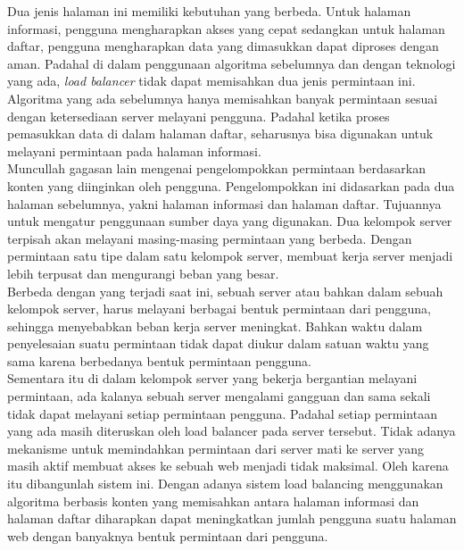 \documentclass{ta-its}
\begin{document}
			\indent Dua jenis halaman ini memiliki kebutuhan yang berbeda. Untuk halaman informasi, pengguna mengharapkan akses yang cepat sedangkan untuk halaman daftar, pengguna mengharapkan data yang dimasukkan dapat diproses dengan aman. Padahal di dalam penggunaan algoritma sebelumnya dan dengan teknologi yang ada, \emph{load balancer} tidak dapat memisahkan dua jenis permintaan ini. Algoritma yang ada sebelumnya hanya memisahkan banyak permintaan sesuai dengan ketersediaan server melayani pengguna. Padahal ketika proses pemasukkan data di dalam halaman daftar, seharusnya bisa digunakan untuk melayani permintaan pada halaman informasi. \\
			\indent Muncullah gagasan lain mengenai pengelompokkan permintaan berdasarkan konten yang diinginkan oleh pengguna. Pengelompokkan ini didasarkan pada dua halaman sebelumnya, yakni halaman informasi dan halaman daftar. Tujuannya untuk mengatur penggunaan sumber daya yang digunakan. Dua kelompok server terpisah akan melayani masing-masing permintaan yang berbeda. Dengan permintaan satu tipe dalam satu kelompok server, membuat kerja server menjadi lebih terpusat dan mengurangi beban yang besar. \\
			\indent Berbeda dengan yang terjadi saat ini, sebuah server atau bahkan dalam sebuah kelompok server, harus melayani berbagai bentuk permintaan dari pengguna, sehingga menyebabkan beban kerja server meningkat. Bahkan waktu dalam penyelesaian suatu permintaan tidak dapat diukur dalam satuan waktu yang sama karena berbedanya bentuk permintaan pengguna. \\
			\indent Sementara itu di dalam kelompok server yang bekerja bergantian melayani permintaan, ada kalanya sebuah server mengalami gangguan dan sama sekali tidak dapat melayani setiap permintaan pengguna. Padahal setiap permintaan yang ada masih diteruskan oleh load balancer pada server tersebut. Tidak adanya mekanisme untuk memindahkan permintaan dari server mati ke server yang masih aktif membuat akses ke sebuah web menjadi tidak maksimal.
			Oleh karena itu dibangunlah sistem ini. Dengan adanya sistem load balancing menggunakan algoritma berbasis konten yang memisahkan antara halaman informasi dan halaman daftar diharapkan dapat meningkatkan jumlah pengguna suatu halaman web dengan banyaknya bentuk permintaan dari pengguna.

            
\end{document}
